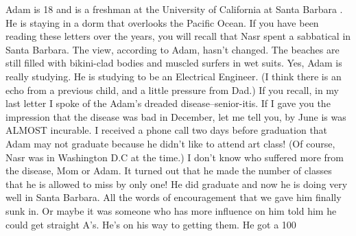 Adam is 18 and is a freshman at the University of California at Santa Barbara .  He is staying in a dorm that overlooks the Pacific Ocean.  If you have been reading these letters over the years, you will recall that Nasr spent a sabbatical in Santa Barbara.  The view, according to Adam, hasn't changed.  The beaches are still filled with bikini-clad bodies and muscled surfers in wet suits.  Yes, Adam is really studying.  He is studying to be an Electrical Engineer.  (I think there is an echo from a previous child, and a little pressure from Dad.)  If you recall, in my last letter I spoke of the Adam's dreaded disease--senior-itis.  If I gave you the impression that the disease was bad in December, let me tell you, by June is was ALMOST incurable.  I received a phone call two days before graduation that Adam may not graduate because he didn't like to attend art class! (Of course, Nasr was in Washington D.C at the time.)  I don't know who suffered more from the disease, Mom or Adam.  It turned out that he made the number of classes that he is allowed to miss by only one!  He did graduate and now he is doing very well in Santa Barbara.  All the words of encouragement that we gave him finally sunk in.  Or maybe it was someone who has more influence on him told him he could get straight A's.  He's on his way to getting them.  He got a 100%

